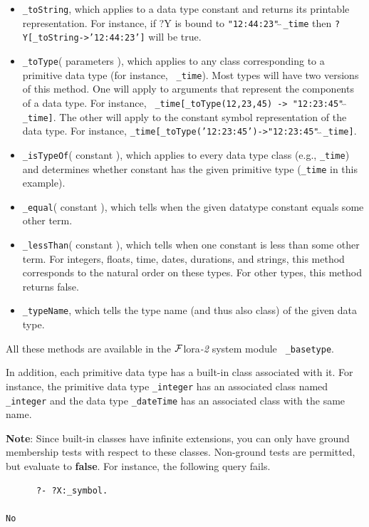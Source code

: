 \documentclass[11pt]{article}
\newcommand{\FLORA}{{\mbox{\sc ${\cal F}${lora}\rm\emph{-2}}}\xspace}
\begin{document}
 \begin{itemize}
    \item {\tt \_toString}, which applies to a data type constant and
      returns its printable representation. For instance, if ?Y is bound to
      {\tt "12:44:23"$\hat{~}\hat{~}$\_time} then {\tt ?Y[\_toString->'12:44:23']} will
      be true.
    \item {\tt \_toType}( parameters ), which applies to any class
      corresponding to a primitive data type (for instance, {\tt
        \_time}). Most types will have two versions of this method. One
      will apply to arguments that represent the components of a data
      type. For instance, {\tt
        \_time[\_toType(12,23,45) -> "12:23:45"$\hat{~}\hat{~}$\_time]}.  The other will
      apply to the constant symbol representation of the data type. For instance,
      {\tt \_time[\_toType('12:23:45')->"12:23:45"$\hat{~}\hat{~}$\_time]}. 
    \item {\tt \_isTypeOf}( constant ), which applies to every data type
      class (e.g., {\tt \_time}) and determines whether constant has the
      given primitive type ({\tt \_time} in this example).
    \item {\tt \_equal}( constant ), which tells when the given datatype constant equals some other term.
    \item {\tt \_lessThan}( constant ), which tells when one constant is
      less than some other term. For integers, floats, time, dates,
      durations, and strings, this method corresponds to the natural order
      on these types. For other types, this method returns false.
    \item {\tt \_typeName}, which tells the type name (and thus also class)
      of the given data type.
    \end{itemize}

    All these methods are available in the \FLORA system module {\tt
      \_basetype}. 

In addition, each primitive data type has a built-in class associated with it.
For instance, the primitive data type {\tt \_integer} has an associated
class  named {\tt \_integer} and the data type {\tt \_dateTime} has an
associated class with the same name.  

{\bf Note}: Since built-in classes have infinite extensions, you can only have
ground membership tests with respect to these classes. Non-ground tests are
permitted, but evaluate to {\bf false}. For instance, the following
query fails.
\begin{verbatim}
      ?- ?X:_symbol.
 
No
\end{verbatim}
\end{document}
